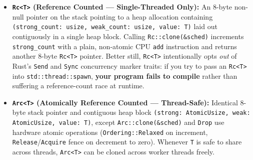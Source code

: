 \begin{itemize}
  \item \textbf{\texttt{Rc<T>} (Reference Counted --- Single-Threaded Only):} An 8-byte non-null pointer on the stack pointing to a heap allocation containing \texttt{(strong\_count: usize, weak\_count: usize, value: T)} laid out contiguously in a single heap block. Calling \texttt{Rc::clone(\&sched)} increments \texttt{strong\_count} with a plain, non-atomic CPU \texttt{add} instruction and returns another 8-byte \texttt{Rc<T>} pointer. Better still, \texttt{Rc<T>} intentionally opts \emph{out} of Rust's \texttt{Send} and \texttt{Sync} concurrency marker traits: if you try to pass an \texttt{Rc<T>} into \texttt{std::thread::spawn}, \textbf{your program fails to compile} rather than suffering a reference-count race at runtime.
  \item \textbf{\texttt{Arc<T>} (Atomically Reference Counted --- Thread-Safe):} Identical 8-byte stack pointer and contiguous heap block \texttt{(strong: AtomicUsize, weak: AtomicUsize, value: T)}, except \texttt{Arc::clone(\&sched)} and \texttt{Drop} use hardware atomic operations (\texttt{Ordering::Relaxed} on increment, \texttt{Release}/\texttt{Acquire} fence on decrement to zero). Whenever \texttt{T} is safe to share across threads, \texttt{Arc<T>} can be cloned across worker threads freely.
\end{itemize}

